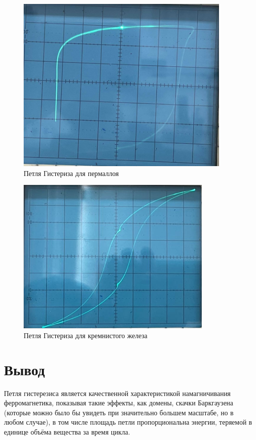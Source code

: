 \documentclass[a4paper]{article}
\theoremstyle{definition}
\theoremstyle{remark}
\begin{document}
    \begin{figure}[h!]
        \centering
        \includegraphics[width=0.5\linewidth]{image/perm.png}
        \caption{Петля Гистериза для пермаллоя}
    \end{figure}

    \begin{figure}[h!]
        \centering
        \includegraphics[width=0.5\linewidth]{image/krfer.png}
        \caption{Петля Гистериза для кремнистого железа}
    \end{figure}

    \section{Вывод}

    Петля гистерезиса является качественной характеристикой намагничивания ферромагнетика, показывая такие эффекты, как домены, скачки Баркгаузена (которые можно было бы увидеть при значительно большем масштабе, но в любом случае), в том числе площадь петли пропорциональна энергии, теряемой в единице объёма вещества за время цикла.
    
\end{document}
